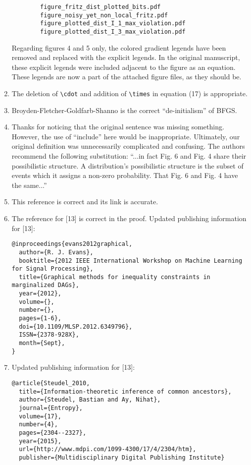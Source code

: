 \documentclass{article}
\begin{document}
\begin{enumerate}
        \begin{verbatim}
        figure_fritz_dist_plotted_bits.pdf
        figure_noisy_yet_non_local_fritz.pdf
        figure_plotted_dist_I_1_max_violation.pdf
        figure_plotted_dist_I_3_max_violation.pdf
        \end{verbatim}
        Regarding figures 4 and 5 only, the colored gradient legends have been removed and replaced with the explicit legends. In the original manuscript, these explicit legends were included adjacent to the figure as an equation. These legends are now a part of the attached figure files, as they should be.
        \item The deletion of \verb|\cdot| and addition of \verb|\times| in equation (17) is appropriate.
        \item Broyden-Fletcher-Goldfarb-Shanno is the correct ``de-initialism'' of BFGS.
        \item Thanks for noticing that the original sentence was missing something. However, the use of ``include'' here would be inappropriate. Ultimately, our original definition was unnecessarily complicated and confusing. The authors recommend the following substitution: ``...in fact Fig. 6 and Fig. 4 share their possibilistic structure. A distribution's possibilistic structure is the subset of events which it assigns a non-zero probability. That Fig. 6 and Fig. 4 have the same...''
        \item This reference is correct and its link is accurate.
        \item The reference for [13] is correct in the proof. Updated publishing information for [13]:
        \begin{verbatim}
@inproceedings{evans2012graphical,
  author={R. J. Evans},
  booktitle={2012 IEEE International Workshop on Machine Learning for Signal Processing},
  title={Graphical methods for inequality constraints in marginalized DAGs},
  year={2012},
  volume={},
  number={},
  pages={1-6},
  doi={10.1109/MLSP.2012.6349796},
  ISSN={2378-928X},
  month={Sept},
}
        \end{verbatim}
        \item Updated publishing information for [13]:
        \begin{verbatim}
@article{Steudel_2010,
  title={Information-theoretic inference of common ancestors},
  author={Steudel, Bastian and Ay, Nihat},
  journal={Entropy},
  volume={17},
  number={4},
  pages={2304--2327},
  year={2015},
  url={http://www.mdpi.com/1099-4300/17/4/2304/htm},
  publisher={Multidisciplinary Digital Publishing Institute}

\end{verbatim}
\end{enumerate}
\end{document}
